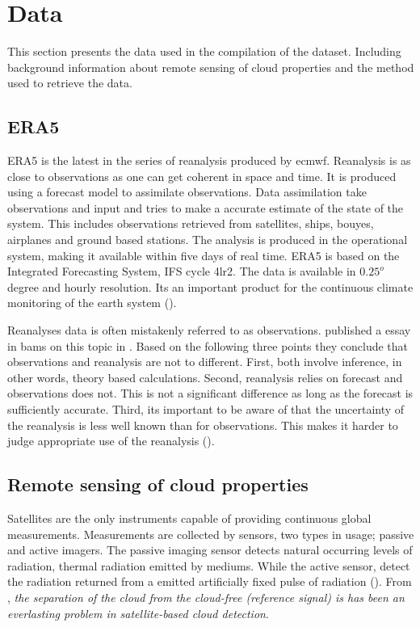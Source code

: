 
\section{Data}
This section presents the data used in the compilation of the dataset. Including background information about remote sensing of cloud properties and the method used to retrieve the data. 

\subsection{ERA5} \label{sec:era5}
ERA5 is the latest in the series of reanalysis produced by \acrfull{ecmwf}. Reanalysis is as close to observations as one can get coherent in space and time. It is produced using a forecast model to assimilate observations. Data assimilation take observations and input and tries to make a accurate estimate of the state of the system. This includes observations retrieved from satellites, ships, bouyes, airplanes and ground based stations. The analysis is produced in the operational system, making it available within five days of real time. ERA5 is based on the Integrated Forecasting System, IFS cycle 4lr2. The data is available in $0.25^o$ degree and hourly resolution. Its an important product for the continuous climate monitoring of the earth system (\cite{Hersbach2018OperationalStatus}).

Reanalyses data is often mistakenly referred to as observations. \citeauthor{Parker2016ReanalysesDifference} published a essay in \acrfull{bams} on this topic in \citeyear{Parker2016ReanalysesDifference}. Based on the following three points they conclude that observations and reanalysis are not to different. First, both involve inference, in other words, theory based calculations. Second, reanalysis relies on forecast and observations does not. This is not a significant difference as long as the forecast is sufficiently accurate. Third, its important to be aware of that the uncertainty of the reanalysis is less well known than for observations. This makes it harder to judge appropriate use of the reanalysis (\cite{Parker2016ReanalysesDifference}). 

\subsection{Remote sensing of cloud properties}
Satellites are the only instruments capable of providing continuous global measurements.
Measurements are collected by sensors, two types in usage; passive and active imagers. The passive imaging sensor detects natural occurring levels of radiation, thermal radiation emitted by mediums. While the active sensor,  detect the radiation returned from a emitted artificially fixed pulse of radiation (\cite{Stephens2018CloudsatSystem}). From \cite{Stockli2019CloudApplications}, \textit{the separation of the cloud from the cloud-free (reference signal) is has been an everlasting problem in satellite-based cloud detection}.


